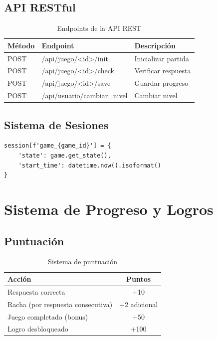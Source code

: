 \documentclass[12pt,a4paper]{article}
\begin{document}
\subsection{API RESTful}

\begin{table}[H]
\centering
\caption{Endpoints de la API REST}
\begin{tabular}{|l|l|l|}
\hline
\textbf{Método} & \textbf{Endpoint} & \textbf{Descripción} \\
\hline
POST & /api/juego/<id>/init & Inicializar partida \\
POST & /api/juego/<id>/check & Verificar respuesta \\
POST & /api/juego/<id>/save & Guardar progreso \\
POST & /api/usuario/cambiar\_nivel & Cambiar nivel \\
\hline
\end{tabular}
\end{table}

\subsection{Sistema de Sesiones}

\begin{lstlisting}[caption=Manejo de sesiones para mantener estado de juego]
session[f'game_{game_id}'] = {
    'state': game.get_state(),
    'start_time': datetime.now().isoformat()
}
\end{lstlisting}

\section{Sistema de Progreso y Logros}

\subsection{Puntuación}

\begin{table}[H]
\centering
\caption{Sistema de puntuación}
\begin{tabular}{|l|c|}
\hline
\textbf{Acción} & \textbf{Puntos} \\
\hline
Respuesta correcta & +10 \\
Racha (por respuesta consecutiva) & +2 adicional \\
Juego completado (bonus) & +50 \\
Logro desbloqueado & +100 \\
\hline
\end{tabular}
\end{table}
\end{document}
